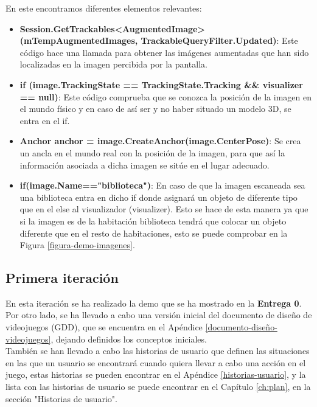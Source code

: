 En este encontramos diferentes elementos relevantes:

\begin{itemize}
  \item \textbf{Session.GetTrackables<AugmentedImage>(mTempAugmentedImages, TrackableQueryFilter.Updated)}: Este código hace una llamada para obtener las imágenes aumentadas que han sido localizadas en la imagen percibida por la pantalla.

  \item \textbf{if (image.TrackingState == TrackingState.Tracking && visualizer == null)}: Este código comprueba que se conozca la posición de la imagen en el mundo físico y en caso de así ser y no haber situado un modelo 3D, se entra en el if.

  \item \textbf{Anchor anchor = image.CreateAnchor(image.CenterPose)}: Se crea un ancla en el mundo real con la posición de la imagen, para que así la información asociada a dicha imagen se sitúe en el lugar adecuado.

  \item \textbf{if(image.Name=="biblioteca")}: En caso de que la imagen escaneada sea una biblioteca entra en dicho if donde asignará un objeto de diferente tipo que en el else al visualizador (visualizer). Esto se hace de esta manera ya que si la imagen es de la habitación biblioteca tendrá que colocar un objeto diferente que en el resto de habitaciones, esto se puede comprobar en la Figura \ref{figura-demo-imagenes}.

\end{itemize}

\subsection{Primera iteración}
En esta iteración se ha realizado la demo que se ha mostrado en la \textbf{Entrega 0}.\\

Por otro lado, se ha llevado a cabo una versión inicial del documento de diseño de videojuegos (GDD), que se encuentra en el Apéndice \ref{documento-diseño-videojuegos}, dejando definidos los conceptos iniciales.\\

También se han llevado a cabo las historias de usuario que definen las situaciones en las que un usuario se encontrará cuando quiera llevar a cabo una acción en el juego, estas historias se pueden encontrar en el Apéndice \ref{historias-usuario}, y la lista con las historias de usuario se puede encontrar en el Capítulo \ref{ch:plan}, en la sección "Historias de usuario".\\

